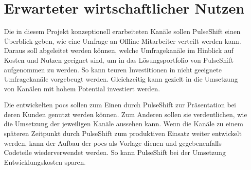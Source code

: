 \section{Erwarteter wirtschaftlicher Nutzen}

Die in diesem Projekt konzeptionell erarbeiteten Kanäle sollen PulseShift einen Überblick geben, wie eine Umfrage an Offline-Mitarbeiter verteilt werden kann. Daraus soll abgeleitet werden können, welche Umfragekanäle im Hinblick auf Kosten und Nutzen geeignet sind, um in das Lösungsportfolio von PulseShift aufgenommen zu werden. So kann teuren Investitionen in nicht geeignete Umfragekanäle vorgebeugt werden. Gleichzeitig kann gezielt in die Umsetzung von Kanälen mit hohem Potential investiert werden. 

Die entwickelten \gls{poc}s sollen zum Einen durch PulseShift zur Präsentation bei deren Kunden genutzt werden können. Zum Anderen sollen sie verdeutlichen, wie die Umsetzung der jeweiligen Kanäle aussehen kann. Wenn die Kanäle zu einem späteren Zeitpunkt durch PulseShift zum produktiven Einsatz weiter entwickelt werden, kann der Aufbau der \gls{poc}s als Vorlage dienen und gegebenenfalls Codeteile wiederverwendet werden. So kann PulseShift bei der Umsetzung Entwicklungskosten sparen.